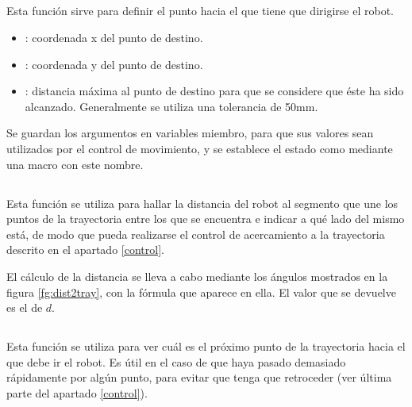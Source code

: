 \subsection{}

\noindent
{}

\noindent
Esta función sirve para definir el punto hacia el que tiene que dirigirse el robot.

\begin{itemize}
  \item {}: coordenada x del punto de destino.
  \item {}: coordenada y del punto de destino.
  \item {}: distancia máxima al punto de destino para que se considere que éste ha sido alcanzado. Generalmente se utiliza una tolerancia de 50mm.
\end{itemize}

\noindent
Se guardan los argumentos en variables miembro, para que sus valores sean utilizados por el control de movimiento, y se establece el estado como   mediante una macro con este nombre.

\subsection{}

\noindent
{}

\noindent
Esta función se utiliza para hallar la distancia del robot al segmento que une los puntos de la trayectoria entre los que se encuentra e indicar a qué lado del mismo está, de modo que pueda realizarse el control de acercamiento a la trayectoria descrito en el apartado \ref{control}.

\noindent
El cálculo de la distancia se lleva a cabo mediante los ángulos mostrados en la figura \ref{fg:dist2tray}, con la fórmula que aparece en ella. El valor que se devuelve es el de $d$.

\subsection{}

\noindent
{}

\noindent
Esta función se utiliza para ver cuál es el próximo punto de la trayectoria hacia el que debe ir el robot. Es útil en el caso de que haya pasado demasiado rápidamente por algún punto, para evitar que tenga que retroceder (ver última parte del apartado \ref{control}).

